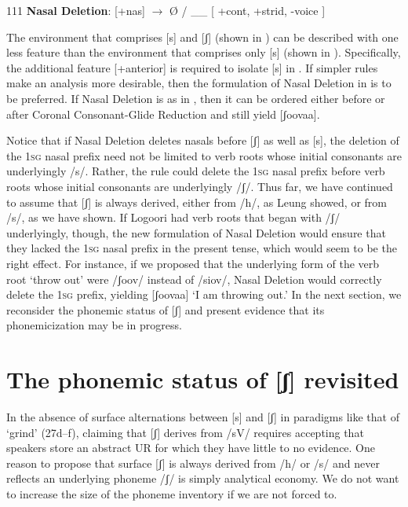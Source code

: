 \documentclass[output=paper]{langsci/langscibook}
\begin{document}
\begin{tabular}{111}
\ea\label{ex:glewwe:31}{}
 \textbf{Nasal Deletion}: [+nas] $\rightarrow$ Ø / \_\_ {[} +cont, +strid, -voice {]} \\{}
\z



The environment that comprises [s] and [ʃ] (shown in ) can be described with one less feature than the environment that comprises only [s] (shown in ). Specifically, the additional feature [+anterior] is required to isolate [s] in . If simpler rules make an analysis more desirable, then the formulation of Nasal Deletion in  is to be preferred. If Nasal Deletion is as in , then it can be ordered either before or after Coronal Consonant-Glide Reduction and still yield [ʃoovaa]. 

Notice that if Nasal Deletion deletes nasals before [ʃ] as well as [s], the deletion of the 1\textsc{sg} nasal prefix need not be limited to verb roots whose initial consonants are underlyingly /s/. Rather, the rule could delete the 1\textsc{sg} nasal prefix before verb roots whose initial consonants are underlyingly /ʃ/. Thus far, we have continued to assume that [ʃ] is always derived, either from /h/, as Leung showed, or from /s/, as we have shown. If Logoori had verb roots that began with /ʃ/ underlyingly, though, the new formulation of Nasal Deletion would ensure that they lacked the 1\textsc{sg} nasal prefix in the present tense, which would seem to be the right effect. For instance, if we proposed that the underlying form of the verb root ‘throw out’ were /ʃoov/ instead of /siov/, Nasal Deletion would correctly delete the 1\textsc{sg} prefix, yielding [ʃoovaa] ‘I am throwing out.’ In the next section, we reconsider the phonemic status of [ʃ] and present evidence that its phonemicization may be in progress.

\section{The phonemic status of [ʃ] revisited}

In the absence of surface alternations between [s] and [ʃ] in paradigms like that of ‘grind’ (27d–f), claiming that [ʃ] derives from /sV/ requires accepting that speakers store an abstract UR for which they have little to no evidence. One reason to propose that surface [ʃ] is always derived from /h/ or /s/ and never reflects an underlying phoneme /ʃ/ is simply analytical economy. We do not want to increase the size of the phoneme inventory if we are not forced to.


\end{tabular}
\end{document}

